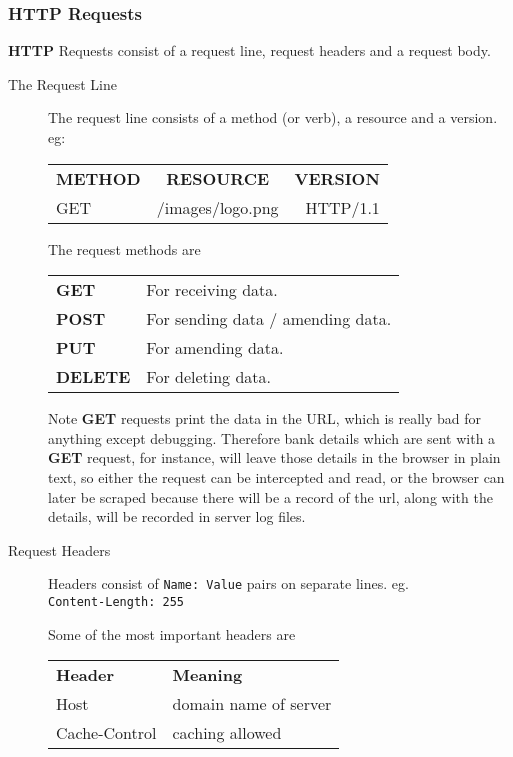 \documentclass[11pt]{article}
\begin{document}
\subsubsection{HTTP Requests}

\textbf{HTTP} Requests consist of a request line, request headers and a request body.
\begin{description}
\item[The Request Line]
The request line consists of a method (or verb), a resource and a version.
eg:

\begin{tabular}{ l c r }
  \textbf{METHOD} & \textbf{RESOURCE} & \textbf{VERSION} \\
  GET & /images/logo.png & HTTP/1.1 \\
\end{tabular}

The request methods are

\begin{tabular}{ l l }
  \textbf{GET} & For receiving data. \\
  \textbf{POST} & For sending data / amending data. \\
  \textbf{PUT} & For amending data. \\
  \textbf{DELETE} & For deleting data. \\
\end{tabular}

Note \textbf{GET} requests print the data in the URL, which is really bad for anything except debugging. Therefore bank details which are sent with a \textbf{GET} request, for instance, will leave those details in the browser in plain text, so either the request can be intercepted and read, or the browser can later be scraped because there will be a record of the url, along with the details, will be recorded in server log files.
\item[Request Headers]
Headers consist of \texttt{Name: Value} pairs on separate lines.
eg. \\
\texttt{Content-Length: 255}
 
Some of the most important headers are \\
\begin{tabular}{ l l }
  \textbf{Header} & \textbf{Meaning} \\

  Host & domain name of server \\

  Cache-Control & caching allowed \\


\end{tabular}
\end{description}
\end{document}
